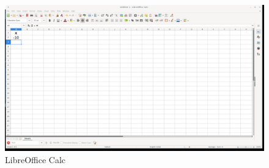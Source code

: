 \begin{figure}[h!]		
	\centering
   	\includegraphics[width=8.0in]{pictures/picture_002.png}
  	\caption{LibreOffice Calc}
   	\label{fig:LibreOfficeCalc002}
\end{figure}